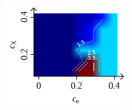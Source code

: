 \documentclass[a4paper, 10pt, twoside, openany]{book} %
\begin{document}
\begin{figure}[b]
\begin{minipage}[t]{0.31\textwidth}
			\label{HKx}
		\end{minipage}
		\hfill
		\begin{minipage}[t]{0.31\textwidth}
			\includegraphics[width=\textwidth]{Abbildungen/Phasendiagramme/Exakt/H_D.pdf}
			\label{HDx}
		\end{minipage}
		
		\bigskip
		

\end{figure}
\end{document}
